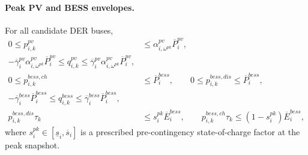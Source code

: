 \paragraph{Peak PV and BESS envelopes.}
For all candidate DER buses,
\begin{align}
0 \le p_{i,k}^{pv} &\le \alpha_{i,\omega^{pk}}^{pv}\overline P_i^{pv},
\label{eq:10b-cont-pv}\\
-\overline\gamma_i^{pv}\alpha_{i,\omega^{pk}}^{pv}\overline P_i^{pv}
\le q_{i,k}^{pv} \le
\overline\gamma_i^{pv}\alpha_{i,\omega^{pk}}^{pv}\overline P_i^{pv},
\label{eq:10b-cont-pv-reactive}\\
0 \le p_{i,k}^{bess,ch} &\le \overline P_i^{bess},
\qquad
0 \le p_{i,k}^{bess,dis} \le \overline P_i^{bess},
\label{eq:10b-cont-bess-power}\\
-\overline\gamma_i^{bess}\overline P_i^{bess}
\le q_{i,k}^{bess} \le
\overline\gamma_i^{bess}\overline P_i^{bess},
\label{eq:10b-cont-bess-reactive}\\
p_{i,k}^{bess,dis}\tau_k &\le s_i^{pk}\overline E_i^{bess},
\qquad
p_{i,k}^{bess,ch}\tau_k \le (1-s_i^{pk})\overline E_i^{bess},
\label{eq:10b-cont-bess-energy}
\end{align}
where \(s_i^{pk}\in[\underline s_i,\overline s_i]\) is a prescribed pre-contingency state-of-charge factor at the peak snapshot.

